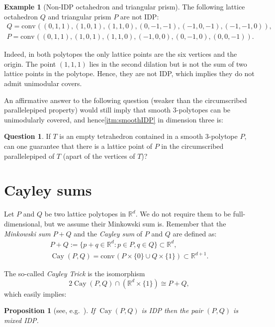 \documentclass{amsart}
\theoremstyle{plain}
\newtheorem{proposition}[theorem]{Proposition}
\theoremstyle{definition}
\newtheorem{example}[theorem]{Example}
\newtheorem{question}[theorem]{Question}
\newcommand{\R}{ \ensuremath{\mathbb{R}}}
\newcommand{\conv}{\ensuremath{\mathrm{conv}}\hspace{1pt}}
\newcommand{\cayley}{\operatorname{Cay}}
\begin{document}
\begin{example}[Non-IDP octahedron and triangular prism]
\label{ex:non-IDP}
The following lattice octahedron $Q$ and triangular prism $P$ are not IDP:
\begin{gather}
Q= \conv((0,1,1),(1,0,1),(1,1,0),(0,-1,-1),(-1,0,-1),(-1,-1,0)),\\
P=\conv((0,1,1),(1,0,1),(1,1,0),(-1,0,0),(0,-1,0),(0,0,-1)).
\end{gather}

Indeed, in both polytopes the only lattice points are the six vertices and the origin. The point $(1,1,1)$ lies in the second dilation but is not the sum of two lattice points in the polytope. Hence, they are not IDP, which implies they do not admit unimodular covers.
\end{example}

An affirmative answer to the following question (weaker than the circumscribed parallelepiped property) would still  imply that smooth $3$-polytopes can be unimodularly covered, and hence\eqref{itm:smoothIDP} in dimension three is:

\begin{question}
If $T$ is an empty tetrahedron contained in a smooth 3-polytope $P$, can one guarantee that there is a lattice point of $P$ in the circumscribed parallelepiped of $T$ (apart of the vertices of $T$)?
\end{question}




\section{ Cayley sums}
\label{sec:cayley}
Let $P$ and $Q$ be two lattice polytopes in $\R^d$. We do not require them to be full-dimensional, but we assume their Minkowski sum is. Remember that the \emph{Minkowski sum} $P+Q$ and the \emph{Cayley sum} of $P$ and $Q$ are defined as:
\begin{gather*}
P + Q := \{ p+q \in \R^d: p\in P, q \in Q\} \subset \R^d,\\
\cayley (P,Q) = \conv( P\times\{0\} \cup Q\times \{1\}) \subset \R^{d+1}.
\end{gather*}


The so-called \emph{Cayley Trick} is the isomorphism
\[
2\cayley(P, Q) \cap (\R^d\times \{1\}) \cong P+Q,
\]
which easily implies:

\begin{proposition}[see, e.g.~]
\label{prop:mixedIDP}
If $\cayley(P,Q)$ is IDP then the pair $(P,Q)$ is mixed IDP.
\end{proposition}
\end{document}

